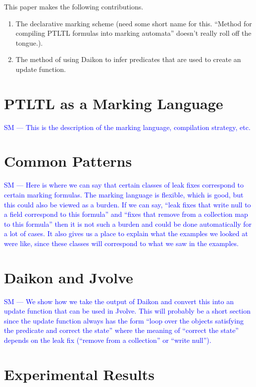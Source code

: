 \documentclass[natbib,preprint]{sigplanconf}
\newcommand{\stephencomment}[1]{\textcolor{blue}{SM --- #1}}
\begin{document}
This paper makes the following contributions.
\begin{enumerate}
\item The declarative marking scheme (need some short name for this.  ``Method for compiling PTLTL formulas into marking automata'' doesn't really roll off the tongue.).
\item The method of using Daikon to infer predicates that are used to create an update function.
\end{enumerate}

\section{PTLTL as a Marking Language}

\stephencomment{This is the description of the marking language, compilation strategy, etc.}

\section{Common Patterns}

\stephencomment{Here is where we can say that certain classes of leak fixes correspond to certain marking formulas.  The marking language is flexible, which is good, but this could also be viewed as a burden.  If we can say, ``leak fixes that write null to a field correspond to this formula'' and ``fixes that remove from a collection map to this formula'' then it is not such a burden and could be done automatically for a lot of cases.  It also gives us a place to explain what the examples we looked at were like, since these classes will correspond to what we saw in the examples.}

\section{Daikon and Jvolve}

\stephencomment{We show how we take the output of Daikon and convert this into an update function that can be used in Jvolve.  This will probably be a short section since the update function always has the form ``loop over the objects satisfying the predicate and correct the state'' where the meaning of ``correct the state'' depends on the leak fix (``remove from a collection'' or ``write null'').}

\section{Experimental Results}
\end{document}
